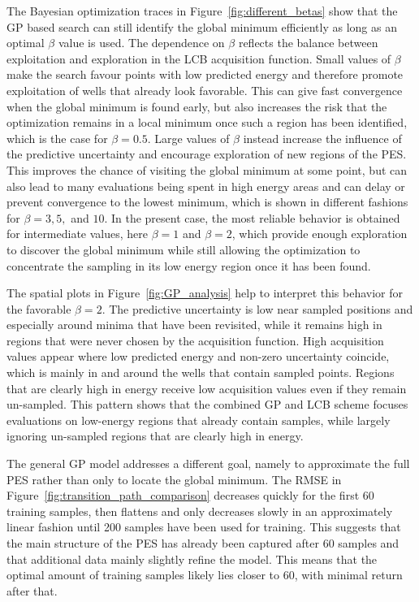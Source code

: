 \documentclass[a4paper, 12pt]{article}
\begin{document}
The Bayesian optimization traces in Figure~\ref{fig:different_betas} show that the GP based search can still identify the global minimum efficiently as long as an optimal $\beta$ value is used. The dependence on $\beta$ reflects the balance between exploitation and exploration in the LCB acquisition function. Small values of $\beta$ make the search favour points with low predicted energy and therefore promote exploitation of wells that already look favorable. This can give fast convergence when the global minimum is found early, but also increases the risk that the optimization remains in a local minimum once such a region has been identified, which is the case for $\beta = 0.5$. Large values of $\beta$ instead increase the influence of the predictive uncertainty and encourage exploration of new regions of the PES. This improves the chance of visiting the global minimum at some point, but can also lead to many evaluations being spent in high energy areas and can delay or prevent convergence to the lowest minimum, which is shown in different fashions for $\beta = 3, 5,$ and $10$. In the present case, the most reliable behavior is obtained for intermediate values, here $\beta = 1$ and $\beta = 2$, which provide enough exploration to discover the global minimum while still allowing the optimization to concentrate the sampling in its low energy region once it has been found.

The spatial plots in Figure~\ref{fig:GP_analysis} help to interpret this behavior for the favorable $\beta = 2$. The predictive uncertainty is low near sampled positions and especially around minima that have been revisited, while it remains high in regions that were never chosen by the acquisition function. High acquisition values appear where low predicted energy and non-zero uncertainty coincide, which is mainly in and around the wells that contain sampled points. Regions that are clearly high in energy receive low acquisition values even if they remain un-sampled. This pattern shows that the combined GP and LCB scheme focuses evaluations on low-energy regions that already contain samples, while largely ignoring un-sampled regions that are clearly high in energy.

The general GP model addresses a different goal, namely to approximate the full PES rather than only to locate the global minimum. The RMSE in Figure~\ref{fig:transition_path_comparison} decreases quickly for the first $60$ training samples, then flattens and only decreases slowly in an approximately linear fashion until 200 samples have been used for training. This suggests that the main structure of the PES has already been captured after $60$ samples and that additional data mainly slightly refine the model. This means that the optimal amount of training samples likely lies closer to $60$, with minimal return after that. 
\end{document}
